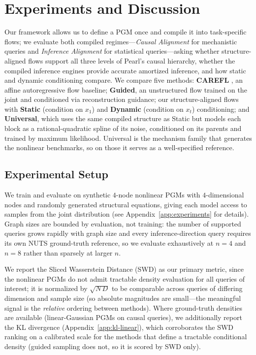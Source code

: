 \section{Experiments and Discussion}
\label{sec:experiments}

Our framework allows us to define a PGM once and compile it into task-specific flows; we evaluate both compiled regimes---\textit{Causal Alignment} for mechanistic queries and \textit{Inference Alignment} for statistical queries---asking whether structure-aligned flows support all three levels of Pearl's causal hierarchy, whether the compiled inference engines provide accurate amortized inference, and how static and dynamic conditioning compare. We compare five methods: \textbf{CAREFL} \citep{khemakhem2021causal}, an affine autoregressive flow baseline; \textbf{Guided}, an unstructured flow trained on the joint and conditioned via reconstruction guidance; our structure-aligned flows with \textbf{Static} (condition on $x_1$) and \textbf{Dynamic} (condition on $x_t$) conditioning; and \textbf{Universal}, which uses the same compiled structure as Static but models each block as a rational-quadratic spline of its noise, conditioned on its parents and trained by maximum likelihood. Universal is the mechanism family that generates the nonlinear benchmarks, so on those it serves as a well-specified reference.

\subsection{Experimental Setup}

We train and evaluate on synthetic $4$-node nonlinear PGMs with $4$-dimensional nodes and randomly generated structural equations, giving each model access to samples from the joint distribution (see Appendix~\ref{app:experiments} for details). Graph sizes are bounded by evaluation, not training: the number of supported queries grows rapidly with graph size and every inference-direction query requires its own NUTS ground-truth reference, so we evaluate exhaustively at $n{=}4$ and $n{=}8$ rather than sparsely at larger $n$.

We report the Sliced Wasserstein Distance (SWD) as our primary metric, since the nonlinear PGMs do not admit tractable density evaluation for all queries of interest; it is normalized by $\sqrt{N\,D}$ to be comparable across queries of differing dimension and sample size (so absolute magnitudes are small---the meaningful signal is the \emph{relative} ordering between methods). Where ground-truth densities are available (linear-Gaussian PGMs on causal queries), we additionally report the KL divergence (Appendix~\ref{app:kl-linear}), which corroborates the SWD ranking on a calibrated scale for the methods that define a tractable conditional density (guided sampling does not, so it is scored by SWD only).

